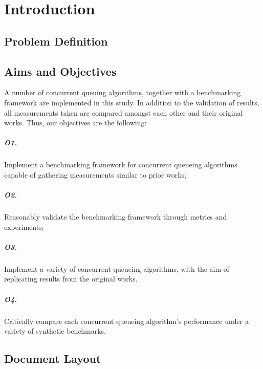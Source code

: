 \chapter{Introduction}
\section{Problem Definition}
\section{Aims and Objectives}

A number of concurrent queuing algorithms, together with a benchmarking
framework are implemented in this study. In addition to the validation of results, all
measurements taken are compared amongst each other and their original works.
Thus, our objectives are the following:

\paragraph{\textbf{O1.}} Implement a benchmarking framework for concurrent queueing
algorithms capable of gathering measurements similar to prior works;

\paragraph{\textbf{O2.}} Reasonably validate the benchmarking framework through
metrics and experiments;

\paragraph{\textbf{O3.}} Implement a variety of concurrent queueing algorithms, with the aim
of replicating results from the original works.

\paragraph{\textbf{O4.}} Critically compare each concurrent queueing algorithm's performance
under a variety of synthetic benchmarks.
\section{Document Layout}
